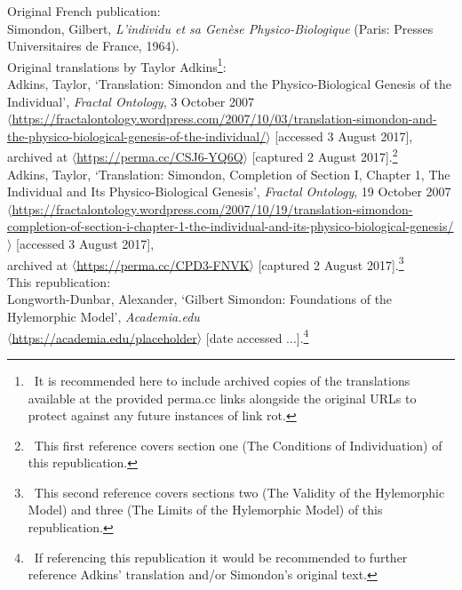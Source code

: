 \documentclass[a4paper]{article}
\begin{document}
\newpage
\begin{center}
{}
\end{center}
Original French publication:\\
[1\baselineskip]
Simondon, Gilbert, \textit{L’individu et sa Genèse Physico-Biologique} (Paris: Presses Universitaires de France, 1964).\\
[2\baselineskip]
Original translations by Taylor Adkins\footnote{\ It is recommended here to include archived copies of the translations available at the provided perma.cc links alongside the original URLs to protect against any future instances of link rot.}:\\
[1\baselineskip]
Adkins, Taylor, \lq{}Translation: Simondon and the Physico-Biological Genesis of the Individual\rq{}, \textit{Fractal Ontology}, 3 October 2007\\ $\langle$\href{https://fractalontology.wordpress.com/2007/10/03/translation-simondon-and-the-physico-biological-genesis-of-the-individual/}{https://fractalontology.wordpress.com/2007/10/03/translation-simondon-and-the-physico-biological-genesis-of-the-individual/}$\rangle$ [accessed 3 August 2017],\\
archived at $\langle$\href{https://perma.cc/CSJ6-YQ6Q}{https://perma.cc/CSJ6-YQ6Q}$\rangle$ [captured 2 August 2017].\footnote{\ This first reference covers section one (The Conditions of Individuation) of this republication.}\\
[1\baselineskip]
Adkins, Taylor, \lq{}Translation: Simondon, Completion of Section I, Chapter 1, The Individual and Its Physico-Biological Genesis\rq{}, \textit{Fractal Ontology}, 19 October 2007\\
$\langle$\href{https://fractalontology.wordpress.com/2007/10/19/translation-simondon-completion-of-section-i-chapter-1-the-individual-and-its-physico-biological-genesis/}{https://fractalontology.wordpress.com/2007/10/19/translation-simondon-completion-of-section-i-chapter-1-the-individual-and-its-physico-biological-genesis/}$\rangle$ [accessed 3 August 2017],\\
archived at $\langle$\href{https://perma.cc/CPD3-FNVK}{https://perma.cc/CPD3-FNVK}$\rangle$ [captured 2 August 2017].\footnote{\ This second reference covers sections two (The Validity of the Hylemorphic Model) and three (The Limits of the Hylemorphic Model) of this republication.}\\
[2\baselineskip]
This republication:\\
[1\baselineskip]
Longworth-Dunbar, Alexander, \lq{}Gilbert Simondon: Foundations of the Hylemorphic Model\rq{}, \textit{Academia.edu}\\
$\langle$\href{https://academia.edu/placeholder}{https://academia.edu/placeholder}$\rangle$ [date accessed ...].\footnote{\ If referencing this republication it would be recommended to further reference Adkins' translation and/or Simondon's original text.}
\end{document}
